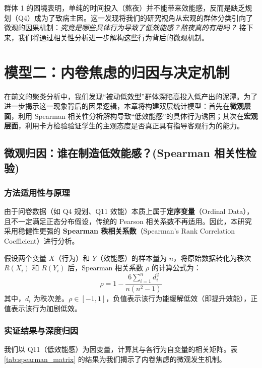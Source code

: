 \documentclass[win,thesis]{hustreport} %
\begin{document}
群体 1 的困境表明，单纯的时间投入（熬夜）并不能带来效能感，反而是缺乏规划（Q4）成为了致病主因。这一发现将我们的研究视角从宏观的群体分类引向了微观的因果机制：\textit{究竟是哪些具体行为导致了低效能感？熬夜真的有用吗？} 接下来，我们将通过相关性分析进一步解构这些行为背后的微观机制。



\newpage
\section{模型二：内卷焦虑的归因与决定机制}

在前文的聚类分析中，我们发现“被动低效型”群体深陷高投入低产出的泥潭。为了进一步揭示这一现象背后的因果逻辑，本章将构建双层统计模型：首先在\textbf{微观层面}，利用 Spearman 相关性分析解构导致“低效能感”的具体行为诱因；其次在\textbf{宏观层面}，利用卡方检验验证学生的主观态度是否真正具有指导客观行为的能力。

\subsection{微观归因：谁在制造低效能感？(Spearman 相关性检验)}

\subsubsection{方法适用性与原理}
由于问卷数据（如 Q4 规划、Q11 效能）本质上属于\textbf{定序变量}（Ordinal Data），且不一定满足正态分布假设，传统的 Pearson 相关系数不再适用。因此，本研究采用稳健性更强的 \textbf{Spearman 秩相关系数}（Spearman's Rank Correlation Coefficient）进行分析。

假设两个变量 $X$（行为）和 $Y$（效能感）的样本量为 $n$，将原始数据转化为秩次 $R(X_i)$ 和 $R(Y_i)$ 后，Spearman 相关系数 $\rho$ 的计算公式为：
\begin{equation}
	\rho = 1 - \frac{6 \sum_{i=1}^{n} d_i^2}{n(n^2 - 1)}
\end{equation}
其中，$d_i$ 为秩次差。$\rho \in [-1, 1]$，负值表示该行为能缓解低效（即提升效能），正值表示该行为加剧低效。

\subsubsection{实证结果与深度归因}
我们以 Q11（低效能感）为因变量，计算其与各行为自变量的相关矩阵。表 \ref{tab:spearman_matrix} 的结果为我们揭示了内卷焦虑的微观发生机制。
\end{document}
